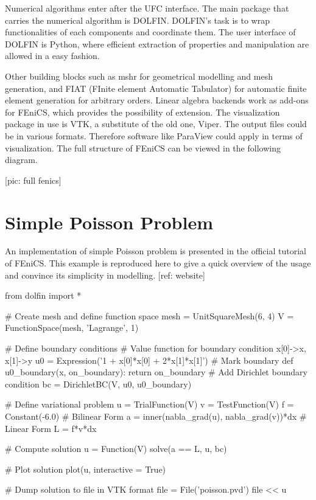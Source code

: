 Numerical algorithms enter after the UFC interface. The main package that carries the numerical algorithm is DOLFIN. DOLFIN's task is to wrap functionalities of each components and coordinate them. The user interface of DOLFIN is Python, where efficient extraction of properties and manipulation are allowed in a easy fashion.  

Other building blocks such as mshr for geometrical modelling and mesh generation, and FIAT (FInite element Automatic Tabulator) for automatic finite element generation for arbitrary orders. Linear algebra backends work as add-ons for FEniCS, which provides the possibility of extension. The visualization package in use is VTK, a substitute of the old one, Viper. The output files could be in various formats. Therefore software like ParaView could apply in terms of visualization. The full structure of FEniCS can be viewed in the following diagram.

[pic: full fenics]

\section{Simple Poisson Problem}
An implementation of simple Poisson problem is presented in the official tutorial of FEniCS. This example is reproduced here to give a quick overview of the usage and convince its simplicity in modelling. [ref: website]

\begin{python}
from dolfin import *

# Create mesh and define function space
mesh = UnitSquareMesh(6, 4)
V = FunctionSpace(mesh, 'Lagrange', 1)

# Define boundary conditions
# Value function for boundary condition x[0]->x, x[1]->y
u0 = Expression('1 + x[0]*x[0] + 2*x[1]*x[1]')
# Mark boundary
def u0_boundary(x, on_boundary):
    return on_boundary
# Add Dirichlet boundary condition
bc = DirichletBC(V, u0, u0_boundary)

# Define variational problem
u = TrialFunction(V)
v = TestFunction(V)
f = Constant(-6.0)
# Bilinear Form
a = inner(nabla_grad(u), nabla_grad(v))*dx
# Linear Form
L = f*v*dx

# Compute solution
u = Function(V)
solve(a == L, u, bc)

# Plot solution
plot(u, interactive = True)

# Dump solution to file in VTK format
file = File('poisson.pvd')
file << u
\end{python}

